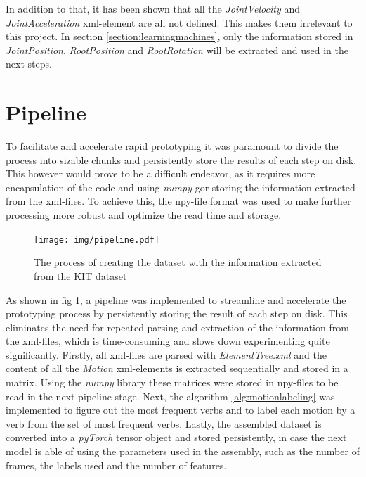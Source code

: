 			In addition to that, it has been shown that all the \textit{JointVelocity} and \textit{JointAcceleration} xml-element are all not defined. This makes them irrelevant to this project. In section \ref{section:learningmachines}, only the information stored in \textit{JointPosition}, \textit{RootPosition} and \textit{RootRotation} will be extracted and used in the next steps.
	\section{Pipeline}\label{sec:pipeline}
		 To facilitate and accelerate rapid prototyping it was paramount to divide the process into sizable chunks and persistently store the results of each step on disk. This however would prove to be a difficult endeavor, as it requires more encapsulation of the code and using \textit{numpy} gor storing the information extracted from the xml-files. To achieve this, the npy-file format was used to make further processing more robust and optimize the read time and storage.
		\begin{figure}[H]
			\centering
			\texttt{[image: img/pipeline.pdf]}
			\caption{The process of creating the dataset with the information extracted from the KIT dataset}
			\label{fig:pipeline}
		\end{figure}
		As shown in fig \ref{fig:pipeline}, a pipeline was implemented to streamline and accelerate the prototyping process by persistently storing the result of each step on disk. This eliminates the need for repeated parsing and extraction of the information from the xml-files, which is time-consuming and slows down experimenting quite significantly. Firstly, all xml-files are parsed with \textit{ElementTree.xml} and the content of all the \textit{Motion} xml-elements is extracted sequentially and stored in a matrix. Using the \textit{numpy} library these matrices were stored in npy-files to be read in the next pipeline stage. Next, the algorithm \ref{alg:motionlabeling} was implemented to figure out the most frequent verbs and to label each motion by a verb from the set of most frequent verbs. Lastly, the assembled dataset is converted into a \textit{pyTorch} tensor object and stored persistently, in case the next model is able of using the parameters used in the assembly, such as the number of frames, the labels used and the number of features.
